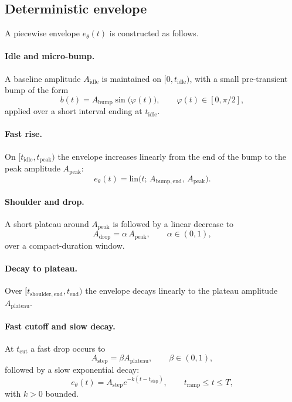 \documentclass[10pt]{article}
\theoremstyle{plain}
\theoremstyle{definition}
\theoremstyle{remark}
\begin{document}
\subsection{Deterministic envelope}

A piecewise envelope $e_\theta(t)$ is constructed as follows.

\paragraph{Idle and micro-bump.}
A baseline amplitude $A_{\mathrm{idle}}$ is maintained on $[0,t_{\mathrm{idle}})$, 
with a small pre-transient bump of the form
\[
b(t) = A_{\mathrm{bump}}
       \sin \bigl( \varphi(t) \bigr), \qquad 
\varphi(t) \in [0,\pi/2],
\]
applied over a short interval ending at $t_{\mathrm{idle}}$.

\paragraph{Fast rise.}
On $[t_{\mathrm{idle}}, t_{\mathrm{peak}})$ the envelope increases linearly from 
the end of the bump to the peak amplitude $A_{\mathrm{peak}}$:
\[
e_\theta(t)
  = \text{lin}\bigl(t;\, A_{\mathrm{bump,end}},\, A_{\mathrm{peak}}\bigr).
\]

\paragraph{Shoulder and drop.}
A short plateau around $A_{\mathrm{peak}}$ is followed by a linear decrease to
\[
A_{\mathrm{drop}} = \alpha\,A_{\mathrm{peak}},\qquad \alpha \in (0,1),
\]
over a compact-duration window.

\paragraph{Decay to plateau.}
Over $[t_{\mathrm{shoulder,end}}, t_{\mathrm{end}})$ the envelope decays 
linearly to the plateau amplitude $A_{\mathrm{plateau}}$.

\paragraph{Fast cutoff and slow decay.}
At $t_{\mathrm{cut}}$ a fast drop occurs to
\[
A_{\mathrm{step}} = \beta A_{\mathrm{plateau}}, \qquad \beta \in (0,1),
\]
followed by a slow exponential decay:
\[
e_\theta(t) = A_{\mathrm{step}} e^{-k(t - t_{\mathrm{step}})}, 
\qquad t_{\mathrm{ramp}} \le t \le T,
\]
with $k>0$ bounded.
\end{document}
